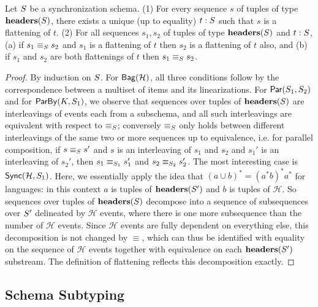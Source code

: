 \begin{proposition}
\label{45:prop:sps-sequence-correspondence}
Let $\ss$ be a synchronization schema.
(1) For every sequence $s$ of tuples of type $\headers(\ss)$, there exists a unique (up to equality) $t : \ss$ such that $s$ is a flattening of $t$.
(2) For all sequences $s_1, s_2$ of tuples of type $\headers(\ss)$ and $t : \ss$,
(a) if $s_1 \equiv_{\ss} s_2$ and $s_1$ is a flattening of  $t$ then $s_2$ is a flattening of $t$ also, and
(b) if $s_1$ and $s_2$ are both flattenings of $t$ then $s_1 \equiv_{\ss} s_2$.
\end{proposition}
\begin{proof}
By induction on $\ss$.
For $\relleaf{\mathcal{H}}$,
all three conditions follow by the correspondence between a multiset of items and its linearizations.
For $\parcomp{\ss_1}{\ss_2}$
and for $\keyby{K}{\ss_1}$,
we observe that sequences over tuples of $\headers(\ss)$ are interleavings of events each from a subschema,
and all such interleavings are equivalent with respect to $\equiv_{\ss}$;
conversely $\equiv_{\ss}$ only holds between different interleavings of the same two or more sequences up to equivalence, i.e. for parallel composition, if $s \equiv_{\ss} s'$ and $s$ is an interleaving of $s_1$ and $s_2$ and $s_1'$ is an interleaving of $s_2'$, then $s_1 \equiv_{\ss_1} s_1'$ and $s_2 \equiv_{\ss_2} s_2'$.
The most interesting case is $\hier{\mathcal{H}}{\ss_1}$.
Here, we essentially apply the idea that $(a \cup b)^{*} = (a^{*} b)^{*} a^{*}$ for languages: in this context $a$ is tuples of $\headers(\ss')$ and $b$ is tuples of $\mathcal{H}$.
So sequences over  tuples of $\headers(\ss)$ decompose into a sequence of subsequences over $\ss'$ delineated by $\mathcal{H}$ events, where there is one more subsequence than the number of $\mathcal{H}$ events.
Since $\mathcal{H}$ events are fully dependent on everything else, this decomposition is not changed by $\equiv$, which can thus be identified with equality on the sequence of $\mathcal{H}$ events together with equivalence on each $\headers(\ss')$ substream.
The definition of flattening reflects this decomposition exactly.
\end{proof}


\subsection{Schema Subtyping}

